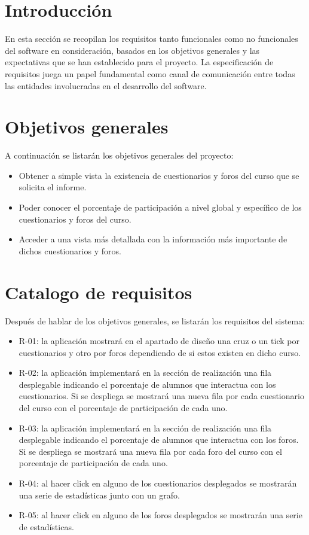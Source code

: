 \label{apendice:B}
\section{Introducción}
En esta sección se recopilan los requisitos tanto funcionales como no funcionales del software en consideración, basados en los objetivos generales y las expectativas que se han establecido para el proyecto. La especificación de requisitos juega un papel fundamental como canal de comunicación entre todas las entidades involucradas en el desarrollo del software.
\section{Objetivos generales}
A continuación se listarán los objetivos generales del proyecto:
\begin{itemize}
	\item
	Obtener a simple vista la existencia de cuestionarios y foros del curso que se solicita el informe.
	\item
	Poder conocer el porcentaje de participación a nivel global y específico de los cuestionarios y foros del curso.
	\item
	Acceder a una vista más detallada con la información más importante de dichos cuestionarios y foros.
\end{itemize}

\section{Catalogo de requisitos}
Después de hablar de los objetivos generales, se listarán los requisitos del sistema:
\begin{itemize}
	\item R-01: la aplicación mostrará en el apartado de diseño una cruz o un tick por cuestionarios y otro por foros dependiendo de si estos existen en dicho curso.
	\item R-02: la aplicación implementará en la sección de realización una fila desplegable indicando el porcentaje de alumnos que interactua con los cuestionarios. Si se despliega se mostrará una nueva fila por cada cuestionario del curso con el porcentaje de participación de cada uno.
	\item R-03: la aplicación implementará en la sección de realización una fila desplegable indicando el porcentaje de alumnos que interactua con los foros. Si se despliega se mostrará una nueva fila por cada foro del curso con el porcentaje de participación de cada uno.
	\item R-04: al hacer click en alguno de los cuestionarios desplegados se mostrarán una serie de estadísticas junto con un grafo.
	\item R-05: al hacer click en alguno de los foros desplegados se mostrarán una serie de estadísticas.
\end{itemize}